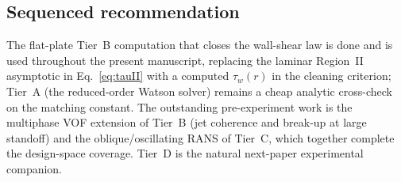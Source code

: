 \documentclass[aps,prfluids,reprint,amsmath,amssymb,floatfix]{revtex4-2}
\begin{document}
\subsection*{Sequenced recommendation}
The flat-plate Tier~B computation that closes the wall-shear law is done and is
used throughout the present manuscript, replacing the laminar Region~II
asymptotic in Eq.~\eqref{eq:tauII} with a computed $\tau_w(r)$ in the cleaning
criterion; Tier~A (the reduced-order Watson solver) remains a cheap analytic
cross-check on the matching constant. The outstanding pre-experiment work is
the multiphase VOF extension of Tier~B (jet coherence and break-up at large
standoff) and the oblique/oscillating RANS of Tier~C, which together complete
the design-space coverage. Tier~D is the natural next-paper experimental
companion.


\end{document}
